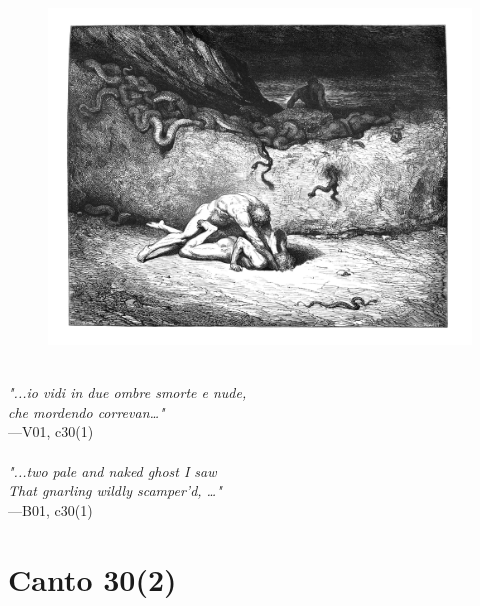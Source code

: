 \documentclass[../Dore_vision.tex]{subfiles}
\begin{document}
\begin{figure}[ht]
\centering
\includegraphics[height=\figsize]{illustrations/book_1/V01, c30(1).jpg}
\end{figure}

\begin{center}
\begin{minipage}{0.8\linewidth}
\textit{\\
"...io vidi in due ombre smorte e nude,\\che mordendo correvan…"} \\
—V01, c30(1) \\~\\
\textit{"...two pale and naked ghost I saw\\That gnarling wildly scamper'd, …"} \\
—B01, c30(1)
\end{minipage}
\end{center}

\newpage

\section{Canto 30(2)}
\end{document}
